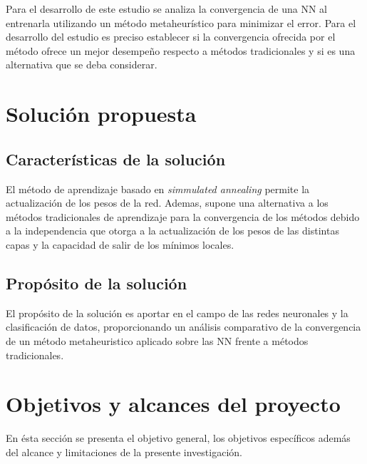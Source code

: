Para el desarrollo de este estudio se analiza la convergencia de una NN al entrenarla utilizando un método metaheurístico para minimizar el error. Para el desarrollo del estudio es preciso establecer si la convergencia ofrecida por el método ofrece un mejor desempeño respecto a métodos tradicionales y si es una alternativa que se deba considerar.




\section{Solución propuesta}
\subsection{Características de la solución}
El método de aprendizaje basado en {\em simmulated annealing} permite la actualización de los pesos de la red. Ademas, supone una alternativa a los métodos tradicionales de aprendizaje para la convergencia de los métodos debido a la independencia que otorga a la actualización de los pesos de las distintas capas y la capacidad de salir de los mínimos locales.

\subsection{Propósito de la solución}
El propósito de la solución es aportar en el campo de las redes neuronales y la clasificación de datos, proporcionando un análisis comparativo de la convergencia de un método metaheuristico aplicado sobre las NN frente a métodos tradicionales.

\section{Objetivos y alcances del proyecto}
En ésta sección se presenta el objetivo general, los objetivos específicos además del alcance y limitaciones de la presente investigación.

